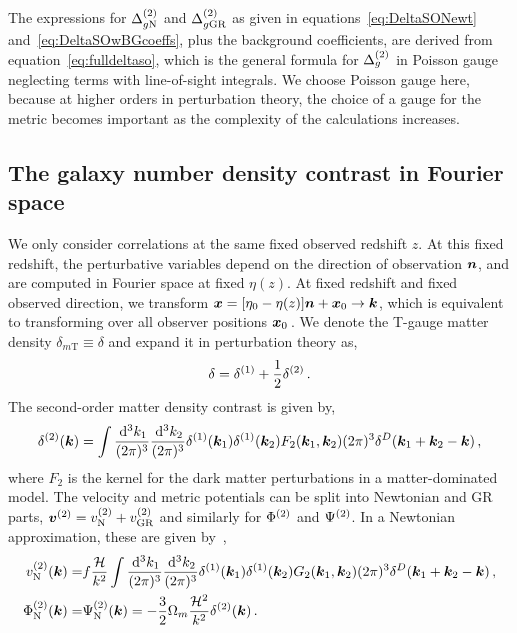 The expressions for $\Delta^{(2)}_{g\mathrm{N}}$ and $\Delta^{(2)}_{g\mathrm{GR}}$ as given in equations~\eqref{eq:DeltaSONewt} and~\eqref{eq:DeltaSOwBGcoeffs}, plus the background coefficients, are derived from equation~\eqref{eq:fulldeltaso}, which is the general formula for $\Delta_g^{(2)}$ in Poisson gauge neglecting terms with line-of-sight integrals. We choose Poisson gauge here, because at higher orders in perturbation theory, the choice of a gauge for the metric becomes important as the complexity of the calculations increases. 

\subsection{The galaxy number density contrast in Fourier space}
We only consider correlations at the same fixed observed redshift $z$. At this fixed redshift, the perturbative variables depend on the direction of observation $\bm {n}$, and are computed in Fourier space at fixed $\eta(z)$. At fixed redshift and fixed observed direction, we transform $\bm {x} = [\eta_0 - \eta(z)]\bm {n} + \bm {x}_0 \to \bm {k}$, which is equivalent to transforming over all observer positions $\bm {x}_0$\,. We denote the T-gauge matter density $\delta_{m\mathrm{T}} \equiv \delta$ and expand it in perturbation theory as, 
\begin{equation}
	\delta = \delta^{(1)} + \frac{1}{2} \delta^{(2)}\,.
\end{equation}
The second-order matter density contrast is given by,
\begin{equation}
	\delta^{(2)}(\bm {k}) = \int \frac{\,\mathrm{d}^3 k_1}{(2\pi)^3} \frac{\,\mathrm{d}^3 k_2}{(2\pi)^3} \delta^{(1)}(\bm {k}_1) \delta^{(1)}(\bm {k}_2) F_2(\bm {k}_1,\bm {k}_2)(2\pi)^3 \delta^D(\bm {k}_1+\bm {k}_2-\bm {k})\,,
\end{equation}
where $F_2$ is the kernel for the dark matter perturbations in a matter-dominated model.
The velocity and metric potentials can be split into Newtonian and GR parts, $\bm{v}^{(2)} = v_{\mathrm{N}}^{(2)} + v_{\mathrm{GR}}^{(2)}$ and similarly for $\Phi^{(2)}$ and $\Psi^{(2)}$. In a Newtonian approximation, these are given by~\cite{Bernardeau:2001qr}, 
\begin{align}
	v^{(2)}_{\mathrm{N}}(\bm {k}) =& f \frac{\mathcal{H}}{k^2} \int \frac{\,\mathrm{d}^3 k_1}{(2\pi)^3} \frac{\,\mathrm{d}^3 k_2}{(2\pi)^3} \delta^{(1)}(\bm {k}_1) \delta^{(1)}(\bm {k}_2) G_2(\bm {k}_1,\bm {k}_2) (2\pi)^3 \delta^D(\bm {k}_1+\bm {k}_2-\bm {k})\,,\\
	\Phi^{(2)}_{\mathrm{N}}(\bm {k}) =& \Psi^{(2)}_{\mathrm{N}}(\bm {k}) = - \frac{3}{2} \Omega_m \frac{\mathcal{H}^2}{k^2} \delta^{(2)}(\bm {k})\,.\label{eq:PsiSOnewtFT}
\end{align}


